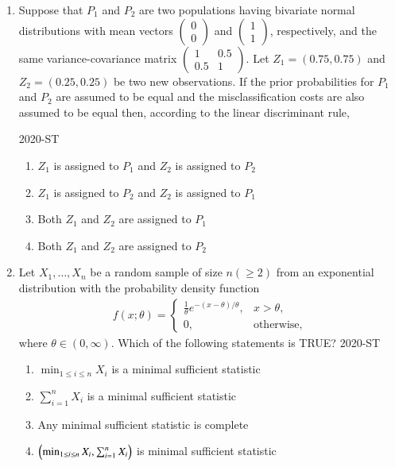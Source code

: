 \documentclass[journal]{IEEEtran}
\begin{document}
\begin{enumerate}
\item Suppose that $P_1$ and $P_2$ are two populations having bivariate normal distributions with mean vectors $\begin{pmatrix} 0 \\ 0 \end{pmatrix}$ and $\begin{pmatrix} 1 \\ 1 \end{pmatrix}$, respectively, and the same variance-covariance matrix $\begin{pmatrix} 1 & 0.5 \\ 0.5 & 1 \end{pmatrix}$. Let $Z_1 = (0.75, 0.75)$ and $Z_2 = (0.25, 0.25)$ be two new observations. If the prior probabilities for $P_1$ and $P_2$ are assumed to be equal and the misclassification costs are also assumed to be equal then, according to the linear discriminant rule,

\hfill{2020-ST}
\begin{enumerate}
    \item $Z_1$ is assigned to $P_1$ and $Z_2$ is assigned to $P_2$
    \item $Z_1$ is assigned to $P_2$ and $Z_2$ is assigned to $P_1$
    \item Both $Z_1$ and $Z_2$ are assigned to $P_1$
    \item Both $Z_1$ and $Z_2$ are assigned to $P_2$
\end{enumerate}

\item Let $X_1, \dots, X_n$ be a random sample of size $n (\geq 2)$ from an exponential distribution with the probability density function
\begin{align*}
f(x; \theta) = \begin{cases} 
\frac{1}{\theta} e^{-(x - \theta)/\theta}, & x > \theta, \\
0, & \text{otherwise},
\end{cases}
\end{align*}
where $\theta \in (0, \infty)$. Which of the following statements is TRUE?
\hfill{2020-ST}
\begin{enumerate}
    \item $\min_{1 \leq i \leq n} X_i$ is a minimal sufficient statistic
    \item $\sum_{i=1}^n X_i$ is a minimal sufficient statistic
    \item Any minimal sufficient statistic is complete
    \item $\left( \min_{1 \leq i \leq n} X_i, \sum_{i=1}^n X_i\right)$ is minimal sufficient statistic
\end{enumerate}


\end{enumerate}
\end{document}
